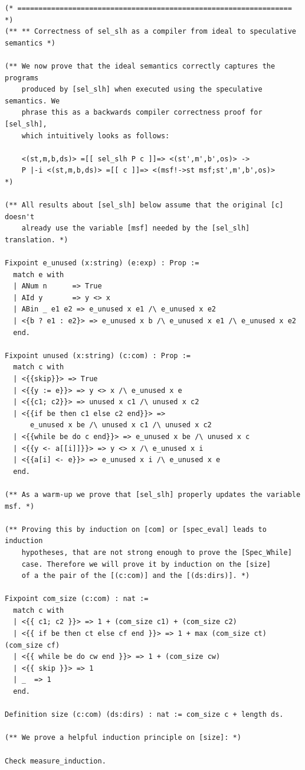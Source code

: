 \documentclass[12pt]{report}
\begin{document}
\begin{verbatim}
(* ================================================================= *)
(** ** Correctness of sel_slh as a compiler from ideal to speculative semantics *)

(** We now prove that the ideal semantics correctly captures the programs
    produced by [sel_slh] when executed using the speculative semantics. We
    phrase this as a backwards compiler correctness proof for [sel_slh],
    which intuitively looks as follows:

    <(st,m,b,ds)> =[[ sel_slh P c ]]=> <(st',m',b',os)> ->
    P |-i <(st,m,b,ds)> =[[ c ]]=> <(msf!->st msf;st',m',b',os)>
*)

(** All results about [sel_slh] below assume that the original [c] doesn't
    already use the variable [msf] needed by the [sel_slh] translation. *)

Fixpoint e_unused (x:string) (e:exp) : Prop :=
  match e with
  | ANum n      => True
  | AId y       => y <> x
  | ABin _ e1 e2 => e_unused x e1 /\ e_unused x e2
  | <{b ? e1 : e2}> => e_unused x b /\ e_unused x e1 /\ e_unused x e2
  end.

Fixpoint unused (x:string) (c:com) : Prop :=
  match c with
  | <{{skip}}> => True
  | <{{y := e}}> => y <> x /\ e_unused x e
  | <{{c1; c2}}> => unused x c1 /\ unused x c2
  | <{{if be then c1 else c2 end}}> =>
      e_unused x be /\ unused x c1 /\ unused x c2
  | <{{while be do c end}}> => e_unused x be /\ unused x c
  | <{{y <- a[[i]]}}> => y <> x /\ e_unused x i
  | <{{a[i] <- e}}> => e_unused x i /\ e_unused x e
  end.

(** As a warm-up we prove that [sel_slh] properly updates the variable msf. *)

(** Proving this by induction on [com] or [spec_eval] leads to induction
    hypotheses, that are not strong enough to prove the [Spec_While]
    case. Therefore we will prove it by induction on the [size]
    of a the pair of the [(c:com)] and the [(ds:dirs)]. *)

Fixpoint com_size (c:com) : nat :=
  match c with
  | <{{ c1; c2 }}> => 1 + (com_size c1) + (com_size c2)
  | <{{ if be then ct else cf end }}> => 1 + max (com_size ct) (com_size cf)
  | <{{ while be do cw end }}> => 1 + (com_size cw)
  | <{{ skip }}> => 1
  | _  => 1
  end.

Definition size (c:com) (ds:dirs) : nat := com_size c + length ds.

(** We prove a helpful induction principle on [size]: *)

Check measure_induction.


\end{verbatim}
\end{document}
